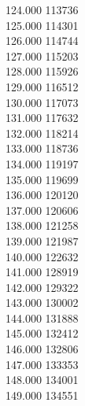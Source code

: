 { 124.000	113736 \\
 125.000	114301 \\
 126.000	114744 \\
 127.000	115203 \\
 128.000	115926 \\
 129.000	116512 \\
 130.000	117073 \\
 131.000	117632 \\
 132.000	118214 \\
 133.000	118736 \\
 134.000	119197 \\
 135.000	119699 \\
 136.000	120120 \\
 137.000	120606 \\
 138.000	121258 \\
 139.000	121987 \\
 140.000	122632 \\
 141.000	128919 \\
 142.000	129322 \\
 143.000	130002 \\
 144.000	131888 \\
 145.000	132412 \\
 146.000	132806 \\
 147.000	133353 \\
 148.000	134001 \\
 149.000	134551 \\
}
